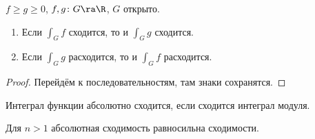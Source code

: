 \begin{conseq}
	$f \ge g \ge 0$, $f,g \colon G \ra \R$, $G$ открыто.
	\begin{enumerate}
		\item Если $\int_G f$ сходится, то и $\int_G g$ сходится.
		\item Если $\int_G g$ расходится, то и $\int_G f$ расходится.
	\end{enumerate}
\end{conseq}
\begin{proof}
	Перейдём к последовательностям, там знаки сохранятся.
\end{proof}

\begin{Def}
	Интеграл функции абсолютно сходится, если сходится интеграл модуля.
\end{Def}

\begin{theorem}
	Для $n > 1$ абсолютная сходимость равносильна сходимости.
\end{theorem}
